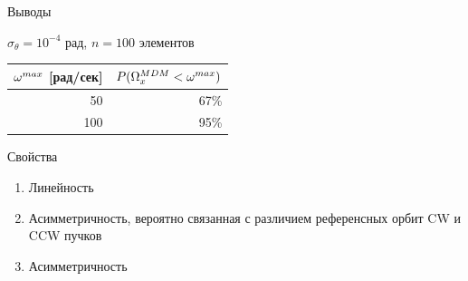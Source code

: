 \documentclass[14pt]{beamer}
\begin{document}
\begin{frame}{Выводы}
	\begin{block}{$\sigma_\theta = 10^{-4}$ рад, $n=100$ элементов}
		\begin{tabular}{r|r}
			\hline
			$\omega^{max}$ [рад/сек] & $P(\Omega_x^{MDM} < \omega^{max})$\\
			\hline
			50  & 67\%\\
			100 & 95\%\\
			\hline
		\end{tabular}
	\end{block}
	\begin{block}{Свойства}
		\begin{enumerate}
			\item Линейность
			\item Асимметричность, вероятно связанная с различием референсных орбит CW и CCW пучков
			\item Асимметричность 
		\end{enumerate}
	\end{block}
\end{frame}
\end{document}
